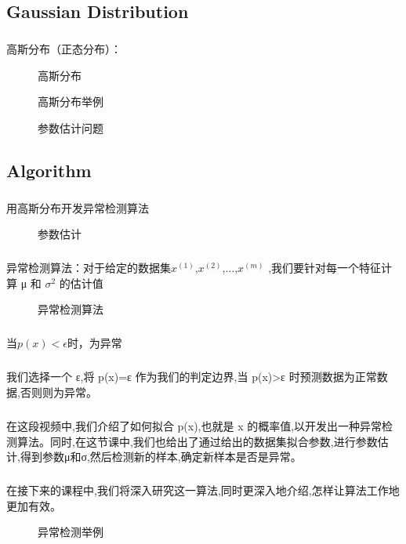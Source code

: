 \documentclass{article}
\begin{document}
\begin{CJK}{UTF8}{gbsn}
\subsection{Gaussian Distribution}
\subparagraph{}
高斯分布（正态分布）：
\begin{figure}[H]
\caption{高斯分布}
\label{fig:907}
\end{figure}
\begin{figure}[H]
\caption{高斯分布举例}
\label{fig:908}
\end{figure}
\begin{figure}[H]
\caption{参数估计问题}
\label{fig:902}
\end{figure}
\begin{figure}[H]
\label{fig:910}
\end{figure}
\begin{figure}[H]
\label{fig:911}
\end{figure}
\begin{figure}[H]
\label{fig:912}
\end{figure}
\subsection{Algorithm}
\subparagraph{}
用高斯分布开发异常检测算法
\begin{figure}[H]
\caption{参数估计}
\label{fig:916}
\end{figure}
\begin{figure}[H]
\label{fig:915}
\end{figure}
\subparagraph{}
异常检测算法：对于给定的数据集$x^{(1)}$,$x^{(2)}$,...,$x^{(m)}$ ,我们要针对每一个特征计算 μ 和 $\sigma^2$ 的估计值
\begin{figure}[H]
\caption{异常检测算法}
\label{fig:918}
\end{figure}
\subparagraph{}
当$p(x)<\epsilon$时，为异常
\subparagraph{}
我们选择一个 ε,将 p(x)=ε 作为我们的判定边界,当 p(x)>ε 时预测数据为正常数据,否则则为异常。
\subparagraph{}
在这段视频中,我们介绍了如何拟合 p(x),也就是 x 的概率值,以开发出一种异常检测算法。同时,在这节课中,我们也给出了通过给出的数据集拟合参数,进行参数估计,得到参数μ和σ,然后检测新的样本,确定新样本是否是异常。
\subparagraph{}
在接下来的课程中,我们将深入研究这一算法,同时更深入地介绍,怎样让算法工作地
更加有效。
\begin{figure}[H]
\caption{异常检测举例}
\label{fig:919}
\end{figure}

\end{CJK}
\end{document}
